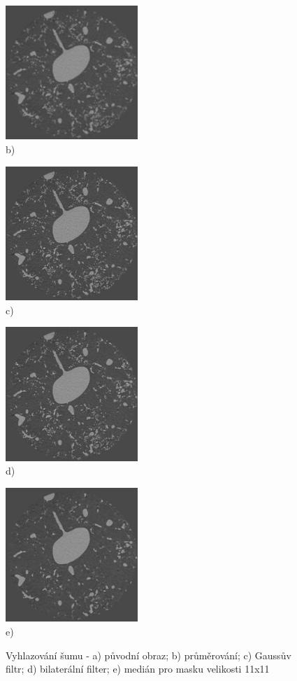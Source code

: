 \documentclass{thesis}%
\begin{document}
\begin{figure}[htp!]
\begin{minipage}[c]{0.4\textwidth}
	\centering\includegraphics[width=5cm]{bluring/convImg.jpg}\\
     b)
   \end{minipage}
    \begin{minipage}[c]{0.4\textwidth}
	\centering\includegraphics[width=5cm]{bluring/gaussImg.jpg}\\
     c)
   \end{minipage}
\hspace*{0.5cm}
    \begin{minipage}[c]{0.4\textwidth}
	\centering\includegraphics[width=5cm]{bluring/bilImg.jpg}\\
     d)
   \end{minipage}
    \begin{minipage}[c]{\textwidth}
	\centering\includegraphics[width=5cm]{bluring/medImg.jpg}\\
     e)
   \end{minipage}

	\caption[Vyhlazování šumu]{Vyhlazování šumu - a) původní obraz; b) průměrování; c) Gaussův filtr; d) bilaterální filter; e) medián pro masku velikosti 11x11}
\end{figure}
\end{document}

